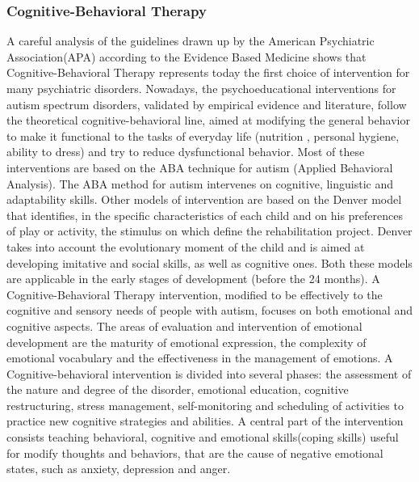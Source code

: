 \subsubsection{Cognitive-Behavioral Therapy}
A careful analysis of the guidelines drawn up by the American Psychiatric Association(APA) according to the Evidence Based Medicine shows that Cognitive-Behavioral Therapy represents today the first choice of intervention for many psychiatric disorders.
Nowadays, the psychoeducational interventions for autism spectrum disorders, validated by empirical evidence and literature, follow the theoretical cognitive-behavioral line, aimed at modifying the general behavior to make it functional to the tasks of everyday life (nutrition , personal hygiene, ability to dress) and try to reduce dysfunctional behavior. Most of these interventions are based on the ABA technique for autism (Applied Behavioral Analysis). The ABA method for autism intervenes on cognitive, linguistic and adaptability skills. Other models of intervention are based on the Denver model that identifies, in the specific characteristics of each child and on his preferences of play or activity, the stimulus on which define the rehabilitation project. Denver takes into account the evolutionary moment of the child and is aimed at developing imitative and social skills, as well as cognitive ones. Both these models are applicable in the early stages of development (before the 24 months).
A Cognitive-Behavioral Therapy intervention, modified to be effectively to the cognitive and sensory needs of people with autism, focuses on both emotional and cognitive aspects. The areas of evaluation and intervention of emotional development are the maturity of emotional expression, the complexity of emotional vocabulary and the effectiveness in the management of emotions.
A Cognitive-behavioral intervention is divided into several phases: the assessment of the nature and degree of the disorder, emotional education, cognitive restructuring, stress management, self-monitoring and scheduling of activities to practice new cognitive strategies and abilities. A central part of the intervention consists teaching behavioral, cognitive and emotional skills(coping skills) useful for modify thoughts and behaviors, that are the cause of negative emotional states, such as anxiety, depression and anger.
